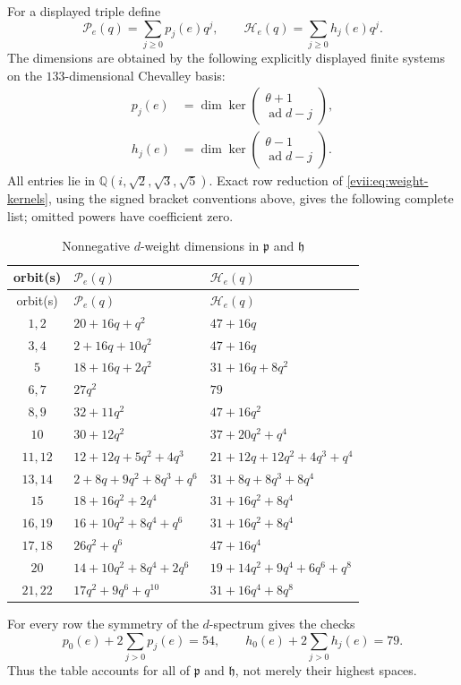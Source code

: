 \documentclass[10pt,a4paper]{amsart}
\numberwithin{equation}{section}
\newcommand{\Q}{\mathbb Q}
\newcommand{\ad}{\operatorname{ad}}
\newcommand{\fh}{\mathfrak h}
\newcommand{\fp}{\mathfrak p}
\begin{document}
For a displayed triple define
\[
 \mathcal P_e(q)=\sum_{j\geq0}p_j(e)q^j,
 \qquad
 \mathcal H_e(q)=\sum_{j\geq0}h_j(e)q^j.
\]
The dimensions are obtained by the following explicitly displayed finite
systems on the $133$-dimensional Chevalley basis:
\begin{equation}\label{evii:eq:weight-kernels}
\begin{aligned}
 p_j(e)&=\dim\ker
 \begin{pmatrix}\theta+1\\ \ad d-j\end{pmatrix},\\
 h_j(e)&=\dim\ker
 \begin{pmatrix}\theta-1\\ \ad d-j\end{pmatrix}.
\end{aligned}
\end{equation}
All entries lie in $\Q(i,\sqrt2,\sqrt3,\sqrt5)$.  Exact row reduction of
\eqref{evii:eq:weight-kernels}, using the signed bracket conventions above,
gives the following complete list; omitted powers have coefficient zero.

\begingroup
\small
\renewcommand{\arraystretch}{1.08}
\begin{longtable}{@{}c >{\raggedright\arraybackslash}p{}
 >{\raggedright\arraybackslash}p{}@{}}
\caption{Nonnegative $d$-weight dimensions in $\fp$ and $\fh$}
\label{evii:tab:weight-dimensions}\\
\toprule
orbit(s)&$\mathcal P_e(q)$&$\mathcal H_e(q)$\\
\midrule
\endfirsthead
\toprule
orbit(s)&$\mathcal P_e(q)$&$\mathcal H_e(q)$\\
\midrule
\endhead
$1,2$   &$20+16q+q^2$&$47+16q$\\
$3,4$   &$2+16q+10q^2$&$47+16q$\\
$5$     &$18+16q+2q^2$&$31+16q+8q^2$\\
$6,7$   &$27q^2$&$79$\\
$8,9$   &$32+11q^2$&$47+16q^2$\\
$10$    &$30+12q^2$&$37+20q^2+q^4$\\
$11,12$ &$12+12q+5q^2+4q^3$&$21+12q+12q^2+4q^3+q^4$\\
$13,14$ &$2+8q+9q^2+8q^3+q^6$&$31+8q+8q^3+8q^4$\\
$15$    &$18+16q^2+2q^4$&$31+16q^2+8q^4$\\
$16,19$ &$16+10q^2+8q^4+q^6$&$31+16q^2+8q^4$\\
$17,18$ &$26q^2+q^6$&$47+16q^4$\\
$20$    &$14+10q^2+8q^4+2q^6$&$19+14q^2+9q^4+6q^6+q^8$\\
$21,22$ &$17q^2+9q^6+q^{10}$&$31+16q^4+8q^8$\\
\bottomrule
\end{longtable}
\endgroup
For every row the symmetry of the $d$-spectrum gives the checks
\[
 p_0(e)+2\sum_{j>0}p_j(e)=54,
 \qquad
 h_0(e)+2\sum_{j>0}h_j(e)=79.
\]
Thus the table accounts for all of $\fp$ and $\fh$, not merely their
highest spaces.
\end{document}
